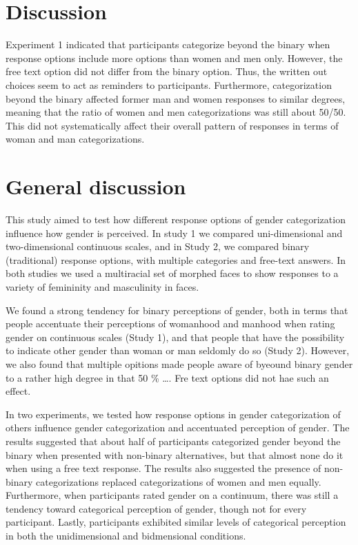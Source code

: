 \documentclass[
  man]{apa7}
\begin{document}
\hypertarget{discussion-1}{%
\section{Discussion}\label{discussion-1}}

Experiment 1 indicated that participants categorize beyond the binary when response options include more options than women and men only. However, the free text option did not differ from the binary option. Thus, the written out choices seem to act as reminders to participants. Furthermore, categorization beyond the binary affected former man and women responses to similar degrees, meaning that the ratio of women and men categorizations was still about 50/50. This did not systematically affect their overall pattern of responses in terms of woman and man categorizations.

\hypertarget{general-discussion}{%
\section{General discussion}\label{general-discussion}}

This study aimed to test how different response options of gender categorization influence how gender is perceived. In study 1 we compared uni-dimensional and two-dimensional continuous scales, and in Study 2, we compared binary (traditional) response options, with multiple categories and free-text answers. In both studies we used a multiracial set of morphed faces to show responses to a variety of femininity and masculinity in faces.

We found a strong tendency for binary perceptions of gender, both in terms that people accentuate their perceptions of womanhood and manhood when rating gender on continuous scales (Study 1), and that people that have the possibility to indicate other gender than woman or man seldomly do so (Study 2). However, we also found that multiple opitions made people aware of byeound binary gender to a rather high degree in that 50 \% \ldots. Fre text options did not hae such an effect.

In two experiments, we tested how response options in gender categorization of others influence gender categorization and accentuated perception of gender. The results suggested that about half of participants categorized gender beyond the binary when presented with non-binary alternatives, but that almost none do it when using a free text response. The results also suggested the presence of non-binary categorizations replaced categorizations of women and men equally. Furthermore, when participants rated gender on a continuum, there was still a tendency toward categorical perception of gender, though not for every participant. Lastly, participants exhibited similar levels of categorical perception in both the unidimensional and bidmensional conditions.
\end{document}

